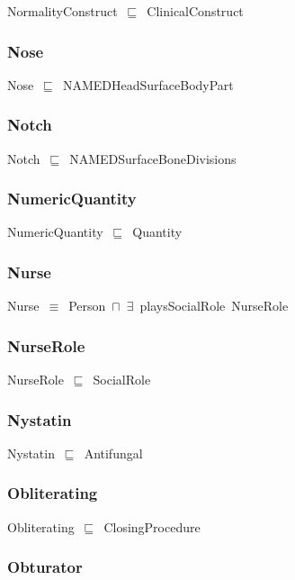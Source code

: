 \documentclass{article}
\begin{document}
NormalityConstruct~\ensuremath{\sqsubseteq}~ClinicalConstruct~

\subsubsection*{Nose}

Nose~\ensuremath{\sqsubseteq}~NAMEDHeadSurfaceBodyPart~

\subsubsection*{Notch}

Notch~\ensuremath{\sqsubseteq}~NAMEDSurfaceBoneDivisions~

\subsubsection*{NumericQuantity}

NumericQuantity~\ensuremath{\sqsubseteq}~Quantity~

\subsubsection*{Nurse}

Nurse~\ensuremath{\equiv}~Person~\ensuremath{\sqcap}~\ensuremath{\exists}~playsSocialRole~NurseRole

\subsubsection*{NurseRole}

NurseRole~\ensuremath{\sqsubseteq}~SocialRole~

\subsubsection*{Nystatin}

Nystatin~\ensuremath{\sqsubseteq}~Antifungal~

\subsubsection*{Obliterating}

Obliterating~\ensuremath{\sqsubseteq}~ClosingProcedure~

\subsubsection*{Obturator}
\end{document}
